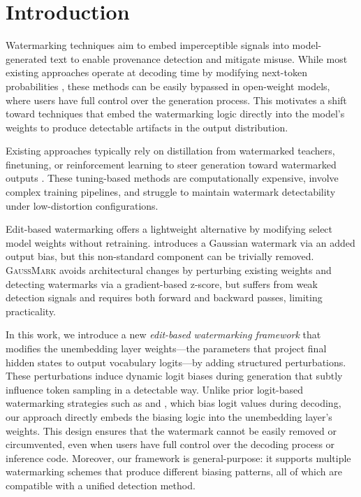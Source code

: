 \section{Introduction}

Watermarking techniques aim to embed imperceptible signals into model-generated text to enable provenance detection and mitigate misuse. While most existing approaches operate at decoding time by modifying next-token probabilities \citep{kirchenbauer2023watermark, aaronson2023reform, kuditipudi2023robust, liu2024adaptive}, these methods can be easily bypassed in open-weight models, where users have full control over the generation process. This motivates a shift toward techniques that embed the watermarking logic directly into the model's weights to produce detectable artifacts in the output distribution.

Existing approaches typically rely on distillation from watermarked teachers, finetuning, or reinforcement learning to steer generation toward watermarked outputs \citep{gu2023learnability, xu2024learningwatermarkllmgeneratedtext, elhassan2025can}. These tuning-based methods are computationally expensive, involve complex training pipelines, and struggle to maintain watermark detectability under low-distortion configurations.

Edit-based watermarking offers a lightweight alternative by modifying select model weights without retraining. \citet{christ2024provably} introduces a Gaussian watermark via an added output bias, but this non-standard component can be trivially removed. \textsc{GaussMark} \cite{block2025gaussmark} avoids architectural changes by perturbing existing weights and detecting watermarks via a gradient-based z-score, but suffers from weak detection signals and requires both forward and backward passes, limiting practicality.

In this work, we introduce a new \emph{edit-based watermarking framework} that modifies the unembedding layer weights—the parameters that project final hidden states to output vocabulary logits—by adding structured perturbations. These perturbations induce dynamic logit biases during generation that subtly influence token sampling in a detectable way. Unlike prior logit-based watermarking strategies such as \citet{kirchenbauer2023watermark} and \citet{liu2024adaptive}, which bias logit values during decoding, our approach directly embeds the biasing logic into the unembedding layer's weights. This design ensures that the watermark cannot be easily removed or circumvented, even when users have full control over the decoding process or inference code. Moreover, our framework is general-purpose: it supports multiple watermarking schemes that produce different biasing patterns, all of which are compatible with a unified detection method.


